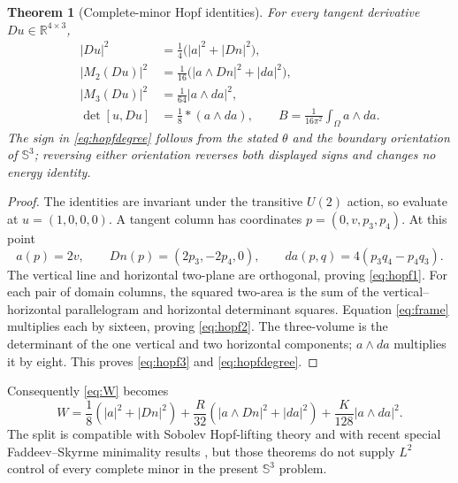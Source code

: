 \documentclass[11pt]{article}
\newtheorem{theorem}{Theorem}[section]
\newcommand{\RR}{\mathbb R}
\newcommand{\SSS}{\mathbb S}
\begin{document}
\begin{theorem}[Complete-minor Hopf identities]
For every tangent derivative $Du\in\RR^{4\times3}$,
\begin{align}
 |Du|^2
 &=\frac14\bigl(|a|^2+|Dn|^2\bigr),                    \label{eq:hopf1}\\
 |M_2(Du)|^2
 &=\frac1{16}\bigl(|a\wedge Dn|^2+|da|^2\bigr),       \label{eq:hopf2}\\
 |M_3(Du)|^2
 &=\frac1{64}|a\wedge da|^2,                          \label{eq:hopf3}\\
 \det[u,Du]
 &=\frac18*(a\wedge da),\qquad
 B=\frac1{16\pi^2}\int_\Omega a\wedge da.            \label{eq:hopfdegree}
\end{align}
The sign in \eqref{eq:hopfdegree} follows from the stated $\theta$ and the
boundary orientation of $\SSS^3$; reversing either orientation reverses both
displayed signs and changes no energy identity.
\end{theorem}

\begin{proof}
The identities are invariant under the transitive $U(2)$ action, so evaluate
at $u=(1,0,0,0)$.  A tangent column has coordinates
$p=(0,v,p_3,p_4)$.  At this point
\begin{equation}
 a(p)=2v,\qquad Dn(p)=(2p_3,-2p_4,0),\qquad
 da(p,q)=4(p_3q_4-p_4q_3).                              \label{eq:frame}
\end{equation}
The vertical line and horizontal two-plane are orthogonal, proving
\eqref{eq:hopf1}.  For each pair of domain columns, the squared two-area is
the sum of the vertical--horizontal parallelogram and horizontal determinant
squares.  Equation \eqref{eq:frame} multiplies each by sixteen, proving
\eqref{eq:hopf2}.  The three-volume is the determinant of the one vertical
and two horizontal components; $a\wedge da$ multiplies it by eight.  This
proves \eqref{eq:hopf3} and \eqref{eq:hopfdegree}.
\end{proof}

Consequently \eqref{eq:W} becomes
\begin{equation}
 W=\frac18(|a|^2+|Dn|^2)
  +\frac{R}{32}(|a\wedge Dn|^2+|da|^2)
  +\frac{K}{128}|a\wedge da|^2.                        \label{eq:splitW}
\end{equation}
The split is compatible with Sobolev Hopf-lifting theory
\cite{AucklyKapitanski2008,GuerraLamyZemas2026Lifting} and with recent
special Faddeev--Skyrme minimality results \cite{GuerraLamyZemas2026Hopf},
but those theorems do not supply $L^2$ control of every complete minor in the
present $\SSS^3$ problem.
\end{document}
